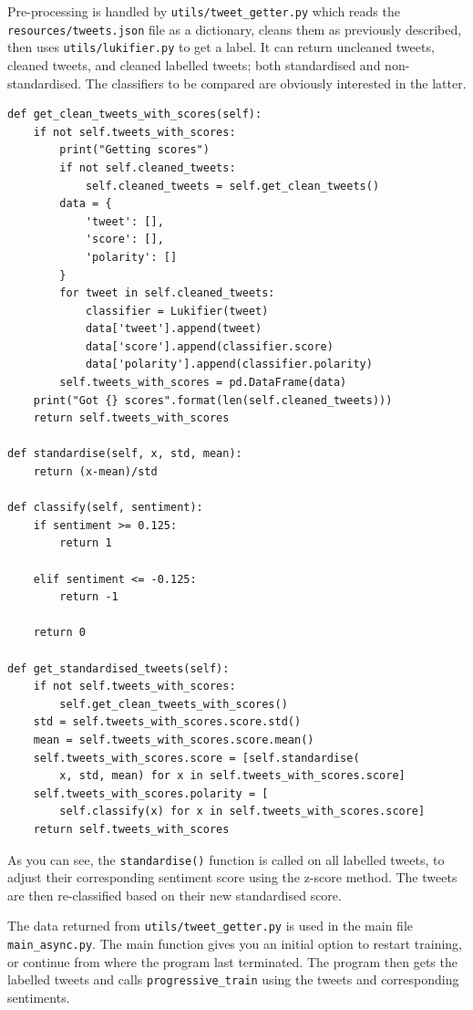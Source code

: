 \documentclass{article}
\begin{document}
Pre-processing is handled by \lstinline{utils/tweet_getter.py} which reads the \lstinline{resources/tweets.json} file as a dictionary, cleans them as previously described, then uses \lstinline{utils/lukifier.py} to get a label.
It can return uncleaned tweets, cleaned tweets, and cleaned labelled tweets; both standardised and non-standardised.
The classifiers to be compared are obviously interested in the latter.

\begin{lstlisting}[caption={Tweet Cleaner \& Feature and Label setup},captionpos=b]
def get_clean_tweets_with_scores(self):
	if not self.tweets_with_scores:
		print("Getting scores")
		if not self.cleaned_tweets:
			self.cleaned_tweets = self.get_clean_tweets()
		data = {
			'tweet': [],
			'score': [],
			'polarity': []
		}
		for tweet in self.cleaned_tweets:
			classifier = Lukifier(tweet)
			data['tweet'].append(tweet)
			data['score'].append(classifier.score)
			data['polarity'].append(classifier.polarity)
		self.tweets_with_scores = pd.DataFrame(data)
	print("Got {} scores".format(len(self.cleaned_tweets)))
	return self.tweets_with_scores

def standardise(self, x, std, mean):
	return (x-mean)/std

def classify(self, sentiment):
	if sentiment >= 0.125:
		return 1

	elif sentiment <= -0.125:
		return -1

	return 0

def get_standardised_tweets(self):
	if not self.tweets_with_scores:
		self.get_clean_tweets_with_scores()
	std = self.tweets_with_scores.score.std()
	mean = self.tweets_with_scores.score.mean()
	self.tweets_with_scores.score = [self.standardise(
		x, std, mean) for x in self.tweets_with_scores.score]
	self.tweets_with_scores.polarity = [
		self.classify(x) for x in self.tweets_with_scores.score]
	return self.tweets_with_scores
\end{lstlisting}

As you can see, the \lstinline{standardise()} function is called on all labelled tweets, to adjust their corresponding sentiment score using the z-score method.
The tweets are then re-classified based on their new standardised score.

The data returned from \lstinline{utils/tweet_getter.py} is used in the main file \lstinline{main_async.py}.
The main function gives you an initial option to restart training, or continue from where the program last terminated.
The program then gets the labelled tweets and calls \lstinline{progressive_train} using the tweets and corresponding sentiments.
\end{document}

